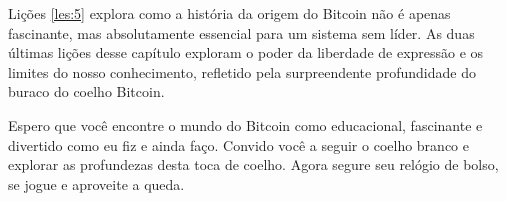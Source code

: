 Lições \ref{les:5} explora como a história da origem do Bitcoin não é apenas fascinante, mas
absolutamente essencial para um sistema sem líder. As duas últimas lições desse
capítulo exploram o poder da liberdade de expressão e os limites do nosso
conhecimento, refletido pela surpreendente profundidade do buraco do coelho Bitcoin.

Espero que você encontre o mundo do Bitcoin como educacional, fascinante e
divertido como eu fiz e ainda faço. Convido você a seguir o coelho branco e
explorar as profundezas desta toca de coelho. Agora segure seu relógio de bolso, se jogue e aproveite a queda.
